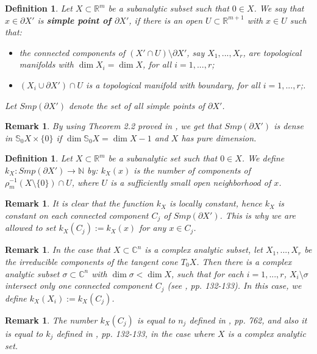 \documentclass{amsart}
\newtheorem{definition}[theorem]{Definition}
\newtheorem{remark}[theorem]{Remark}
\newcommand{\R}{\mathbb{R}}
\newcommand{\C}{\mathbb{C}}
\newcommand{\N}{\mathbb{N}}
\begin{document}
\begin{definition}
Let $X\subset \R^m$ be a subanalytic subset such that $0\in X$. We say that $x\in\partial X'$ is {\bf simple point of $\partial X'$}, if there is an open $U\subset \R^{m+1}$ with $x\in U$ such that:
\begin{itemize}
\item [a)] the connected components of $(X'\cap U)\setminus \partial X'$, say $X_1,..., X_r$, are topological manifolds with $\dim X_i=\dim X$, for all $i=1,...,r$;
\item [b)] $(X_i\cup \partial X')\cap U$ is a topological manifold with boundary, for all $i=1,...,r$;.
\end{itemize}
Let $Smp(\partial X')$ denote the set of all simple points of $\partial X'$.
\end{definition}
\begin{remark}
{\rm By using Theorem 2.2 proved in \cite{Pawlucki:1985}, we get that $Smp(\partial X')$ is dense in $\mathbb{S}_0X\times \{0\}$ if $\dim \mathbb{S}_0X=\dim X-1$ and $X$ has pure dimension.}
\end{remark}
\begin{definition}
Let $X\subset \R^m$ be a subanalytic set such that $0\in X$.
We define $k_X:Smp(\partial X')\to \N$ by: $k_X(x)$ is the number of components of $\rho_m^{-1}(X\setminus\{0\})\cap U$, where $U$ is a sufficiently small open neighborhood of $x$.
\end{definition}

\begin{remark}
{\rm It is clear that the function $k_X$ is locally constant, hence $k_X$ is constant on each connected component $C_j$ of $Smp(\partial X')$. This is why we are allowed to set $k_X(C_j):=k_X(x)$ for any $x\in C_j$.}
\end{remark}
\begin{remark}
{\rm In the case that $X\subset \C^n$ is a complex analytic subset, let $X_1,...,X_r$ be the irreducible components of the tangent cone $T_0X$. Then there is a complex analytic subset $\sigma\subset \C^n$ with $\dim \sigma <\dim X$, such that for each $i=1,...,r$, $X_i\setminus \sigma$ intersect only one connected component $C_j$ (see \cite{Chirka:1989}, pp. 132-133). In this case, we define $k_X(X_i):=k_X(C_j)$.}
\end{remark}
\begin{remark}
{\rm The number $k_X(C_j)$ is equal to $n_j$ defined in \cite{Kurdyka:1989}, pp. 762, and also it is equal to $k_j$ defined in \cite{Chirka:1989}, pp. 132-133, in the case where $X$ is a complex analytic set.}
\end{remark}
\end{document}
